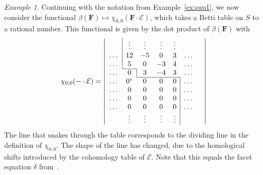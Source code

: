 \documentclass[12pt]{amsart}
\theoremstyle{definition}
\theoremstyle{remark}
\newtheorem{example}[lemma]{Example}
\newcommand{\cE}{\mathcal{E}}
\newcommand{\FF}{\mathbf{F}}
\newcommand{\zp}{\circ}
\begin{document}
\begin{example}\label{ex:sup2}
Continuing with the notation from Example~\ref{ex:sup1}, we now consider the functional $\beta(\FF)\mapsto \chi_{0,0}(\FF\cdot \cE)$, which takes a Betti table on $S$ to a rational number.  This functional is given by the dot product of $\beta(\FF)$ with
\[
\chi_{0,0}(-\cdot \cE)=
\left|
\begin{array}{ccccccc}
&\multicolumn{1}{|c}{\vdots}&\vdots&\vdots&\vdots&&\\
\dots&\multicolumn{1}{|c}{12}&-5&0&3&\dots\\
\dots&\multicolumn{1}{|c}{5}&0&-3&4&\dots\\ \cline{2-2}
\dots&{0}&\multicolumn{1}{|c}{3}&-4&3&\dots\\ \cline{3-5}
\dots&0^\zp&0&0&{0}&\multicolumn{1}{|c}{\dots}\\
\dots&0&0&0&0&\multicolumn{1}{|c}{\dots}\\
\dots&0&0&0&0&\multicolumn{1}{|c}{\dots}\\
\dots&0&0&0&0&\multicolumn{1}{|c}{\dots}\\
&\vdots&\vdots&\vdots&\vdots&\multicolumn{1}{|c}{}&\\
\end{array}
\right|
\]
The line that snakes through the table corresponds to the dividing line in the definition of $\chi_{0,0}$. The shape of the line has changed, due to the homological shifts introduced by the cohomology table of $\cE$.  Note that this equals the facet equation $\delta$ from~\cite[\S3]{eis-schrey-icm}.
\end{example}

\end{document}
